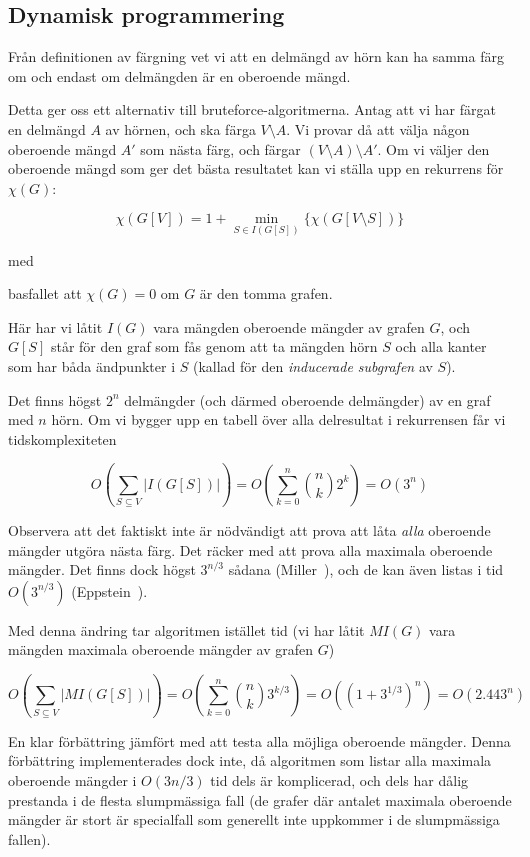 \documentclass[a4paper]{report}
\begin{document}
\subsection{Dynamisk programmering}

Från definitionen av färgning vet vi att en delmängd av hörn kan ha samma färg om och endast om delmängden är en oberoende mängd.

Detta ger oss ett alternativ till bruteforce-algoritmerna. Antag att vi har färgat en delmängd $A$ av hörnen, och ska färga $V \setminus A$. Vi provar då att välja någon oberoende mängd $A'$ som nästa färg, och färgar $(V \setminus A) \setminus A'$. Om vi väljer den oberoende mängd som ger det bästa resultatet kan vi ställa upp en rekurrens för $\chi(G)$:

$$\chi(G[V]) = 1 + \min_{S \in I(G[S])}\{\chi(G[V \setminus S])\}$$

med

basfallet att $\chi(G) = 0$ om $G$ är den tomma grafen.

Här har vi låtit $I(G)$ vara mängden oberoende mängder av grafen $G$, och $G[S]$ står för den graf som fås genom att ta mängden hörn $S$ och alla kanter som har båda ändpunkter i $S$ (kallad för den \emph{inducerade subgrafen} av $S$).

Det finns högst $2^n$ delmängder (och därmed oberoende delmängder) av en graf med $n$ hörn. Om vi bygger upp en tabell över alla delresultat
i rekurrensen får vi tidskomplexiteten

$$O(\sum_{S \subseteq V}{|I(G[S])|}) = O(\sum^n_{k=0}{{n \choose k}2^k}) = O(3^n)$$


Observera att det faktiskt inte är nödvändigt att prova att låta \emph{alla} oberoende mängder utgöra nästa färg. Det räcker med att prova alla maximala oberoende mängder. Det finns dock högst $3^{n/3}$ sådana (Miller~\cite{Miller:1960}), och de kan även listas i tid $O(3^{n/3})$ (Eppstein~\cite{Eppstein:2003}).

Med denna ändring tar algoritmen istället tid (vi har låtit $MI(G)$ vara mängden maximala oberoende mängder av grafen $G$)

$$O(\sum_{S \subseteq V}{|MI(G[S])|}) = O(\sum^n_{k=0}{{n \choose k}3^{k/3}}) = O((1 + 3^{1/3})^n) =  O(2.443^n)$$

En klar förbättring jämfört med att testa alla möjliga oberoende mängder. Denna förbättring implementerades dock inte, då algoritmen som listar alla maximala
oberoende mängder i $O(3{n/3})$ tid dels är komplicerad, och dels har dålig prestanda i de flesta slumpmässiga fall (de grafer där antalet maximala oberoende mängder
är stort är specialfall som generellt inte uppkommer i de slumpmässiga fallen).
\end{document}
